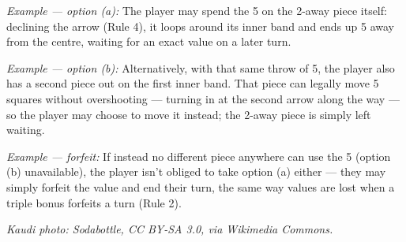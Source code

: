 \documentclass[10pt,a4paper]{article}
\begin{document}
\begin{enumerate}[leftmargin=2em]
    \emph{Example --- option (a):} The player may spend the 5 on the
    2-away piece itself: declining the arrow (Rule 4), it loops around its
    inner band and ends up 5 away from the centre, waiting for an exact
    value on a later turn.

    \begin{center}
      
    \end{center}

    \emph{Example --- option (b):} Alternatively, with that same throw of
    5, the player also has a second piece out on the first inner band.
    That piece can legally move 5 squares without overshooting --- turning
    in at the second arrow along the way --- so the player may choose to
    move it instead; the 2-away piece is simply left waiting.

    \begin{center}
      
    \end{center}

    \emph{Example --- forfeit:} If instead no different piece anywhere can
    use the 5 (option (b) unavailable), the player isn't obliged to take
    option (a) either --- they may simply forfeit the value and end their
    turn, the same way values are lost when a triple bonus forfeits a turn
    (Rule 2).

    \begin{center}
      
    \end{center}
\end{enumerate}









 










{\small\emph{Kaudi photo: Sodabottle, CC BY-SA 3.0, via Wikimedia Commons.}}
\end{document}
